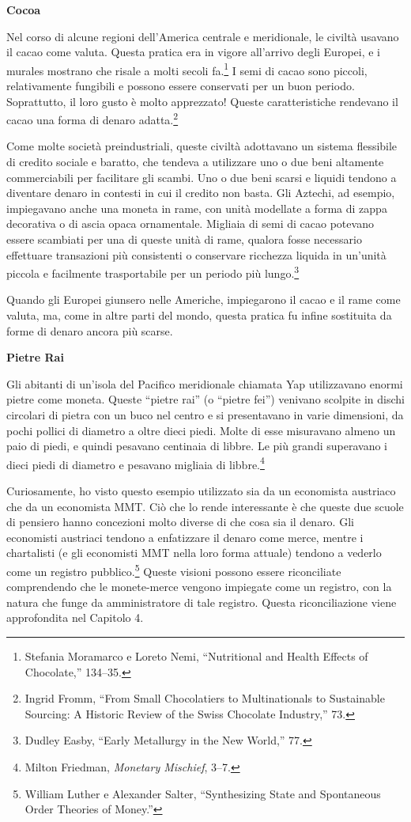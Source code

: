 \documentclass[
  a5paper,
  smalldemyvopaper,10pt,twoside,onecolumn,openright,extrafontsizes,hidelinks]{memoir}
\begin{document}
\textbf{Cocoa}

Nel corso di alcune regioni dell'America centrale e meridionale, le
civiltà usavano il cacao come valuta. Questa pratica era in vigore
all'arrivo degli Europei, e i murales mostrano che risale a molti secoli
fa.\footnote{Stefania Moramarco e Loreto Nemi, ``Nutritional and Health
  Effects of Chocolate,'' 134--35.} I semi di cacao sono piccoli,
relativamente fungibili e possono essere conservati per un buon periodo.
Soprattutto, il loro gusto è molto apprezzato! Queste caratteristiche
rendevano il cacao una forma di denaro adatta.\footnote{Ingrid Fromm,
  ``From Small Chocolatiers to Multinationals to Sustainable Sourcing: A
  Historic Review of the Swiss Chocolate Industry,'' 73.}

Come molte società preindustriali, queste civiltà adottavano un sistema
flessibile di credito sociale e baratto, che tendeva a utilizzare uno o
due beni altamente commerciabili per facilitare gli scambi. Uno o due
beni scarsi e liquidi tendono a diventare denaro in contesti in cui il
credito non basta. Gli Aztechi, ad esempio, impiegavano anche una moneta
in rame, con unità modellate a forma di zappa decorativa o di ascia
opaca ornamentale. Migliaia di semi di cacao potevano essere scambiati
per una di queste unità di rame, qualora fosse necessario effettuare
transazioni più consistenti o conservare ricchezza liquida in un'unità
piccola e facilmente trasportabile per un periodo più lungo.\footnote{Dudley
  Easby, ``Early Metallurgy in the New World,'' 77.}

Quando gli Europei giunsero nelle Americhe, impiegarono il cacao e il
rame come valuta, ma, come in altre parti del mondo, questa pratica fu
infine sostituita da forme di denaro ancora più scarse.

\textbf{Pietre Rai}

Gli abitanti di un'isola del Pacifico meridionale chiamata Yap
utilizzavano enormi pietre come moneta. Queste ``pietre rai'' (o
``pietre fei'') venivano scolpite in dischi circolari di pietra con un
buco nel centro e si presentavano in varie dimensioni, da pochi pollici
di diametro a oltre dieci piedi. Molte di esse misuravano almeno un paio
di piedi, e quindi pesavano centinaia di libbre. Le più grandi
superavano i dieci piedi di diametro e pesavano migliaia di
libbre.\footnote{Milton Friedman, \emph{Monetary Mischief}, 3--7.}

Curiosamente, ho visto questo esempio utilizzato sia da un economista
austriaco che da un economista MMT. Ciò che lo rende interessante è che
queste due scuole di pensiero hanno concezioni molto diverse di che cosa
sia il denaro. Gli economisti austriaci tendono a enfatizzare il denaro
come merce, mentre i chartalisti (e gli economisti MMT nella loro forma
attuale) tendono a vederlo come un registro pubblico.\footnote{William
  Luther e Alexander Salter, ``Synthesizing State and Spontaneous Order
  Theories of Money.''} Queste visioni possono essere riconciliate
comprendendo che le monete-merce vengono impiegate come un registro, con
la natura che funge da amministratore di tale registro. Questa
riconciliazione viene approfondita nel Capitolo 4.
\end{document}
